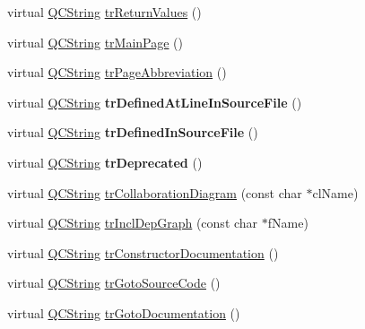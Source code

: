 \begin{DoxyCompactItemize}
\item 
virtual \mbox{\hyperlink{class_q_c_string}{Q\+C\+String}} \mbox{\hyperlink{class_translator_chinese_a306f23c07ef2bcca2b50327eb823b0d0}{tr\+Return\+Values}} ()
\item 
virtual \mbox{\hyperlink{class_q_c_string}{Q\+C\+String}} \mbox{\hyperlink{class_translator_chinese_a7709577f55e8be82e3a69411b9e17105}{tr\+Main\+Page}} ()
\item 
virtual \mbox{\hyperlink{class_q_c_string}{Q\+C\+String}} \mbox{\hyperlink{class_translator_chinese_aa7c088816c03d2721b443fe4959145fc}{tr\+Page\+Abbreviation}} ()
\item 
\mbox{\label{class_translator_chinese_a3628119a560e605599ad8e5935df5d2a}} 
virtual \mbox{\hyperlink{class_q_c_string}{Q\+C\+String}} {\bfseries tr\+Defined\+At\+Line\+In\+Source\+File} ()
\item 
\mbox{\label{class_translator_chinese_ab43a989a1ee3bcd0b6f6aabcd06cb711}} 
virtual \mbox{\hyperlink{class_q_c_string}{Q\+C\+String}} {\bfseries tr\+Defined\+In\+Source\+File} ()
\item 
\mbox{\label{class_translator_chinese_a0d55db45c879953a8cbbaa43524af9dd}} 
virtual \mbox{\hyperlink{class_q_c_string}{Q\+C\+String}} {\bfseries tr\+Deprecated} ()
\item 
virtual \mbox{\hyperlink{class_q_c_string}{Q\+C\+String}} \mbox{\hyperlink{class_translator_chinese_acf42cb648e0de551913b17331dfa5eb4}{tr\+Collaboration\+Diagram}} (const char $\ast$cl\+Name)
\item 
virtual \mbox{\hyperlink{class_q_c_string}{Q\+C\+String}} \mbox{\hyperlink{class_translator_chinese_ad3bfb463e7c9012d1ac9dbbcfeccceb7}{tr\+Incl\+Dep\+Graph}} (const char $\ast$f\+Name)
\item 
virtual \mbox{\hyperlink{class_q_c_string}{Q\+C\+String}} \mbox{\hyperlink{class_translator_chinese_ab4a88be0f5d92125f8906711158646bb}{tr\+Constructor\+Documentation}} ()
\item 
virtual \mbox{\hyperlink{class_q_c_string}{Q\+C\+String}} \mbox{\hyperlink{class_translator_chinese_a9e952e9121278d490d421697b1448b3a}{tr\+Goto\+Source\+Code}} ()
\item 
virtual \mbox{\hyperlink{class_q_c_string}{Q\+C\+String}} \mbox{\hyperlink{class_translator_chinese_a07f0bcd548e0087adf1b75c6ecee7732}{tr\+Goto\+Documentation}} ()

\end{DoxyCompactItemize}
